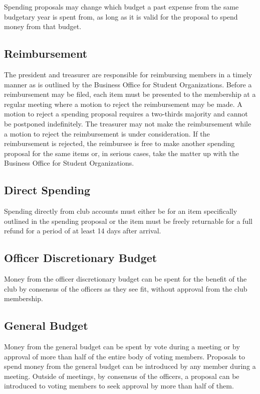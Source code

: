 \documentclass{article}
\begin{document}
Spending proposals may change which budget a past expense from the same
budgetary year is spent from, as long as it is valid for the proposal to spend
money from that budget.

\subsection{Reimbursement}

The president and treasurer are responsible for reimbursing members in a timely
manner as is outlined by the Business Office for Student Organizations. Before a
reimbursement may be filed, each item must be presented to the membership at a
regular meeting where a motion to reject the reimbursement may be made. A motion
to reject a spending proposal requires a two-thirds majority and cannot be
postponed indefinitely. The treasurer may not make the reimbursement while a
motion to reject the reimbursement is under consideration. If the reimbursement
is rejected, the reimbursee is free to make another spending proposal for the
same items or, in serious cases, take the matter up with the Business Office for
Student Organizations.

\subsection{Direct Spending}

Spending directly from club accounts must either be for an item specifically 
outlined in the spending proposal or the item must be freely returnable for 
a full refund for a period of at least 14 days after arrival.

\subsection{Officer Discretionary Budget}

Money from the officer discretionary budget can be spent for the benefit of the
club by consensus of the officers as they see fit, without approval from the
club membership.

\subsection{General Budget}

Money from the general budget can be spent by vote during a meeting or by
approval of more than half of the entire body of voting members. Proposals to
spend money from the general budget can be introduced by any member during a
meeting. Outside of meetings, by consensus of the officers, a proposal can be
introduced to voting members to seek approval by more than half of them.
\end{document}
